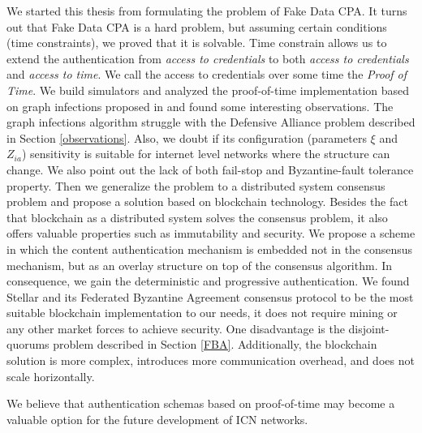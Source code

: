 We started this thesis from formulating the problem of Fake Data CPA. It turns out that Fake Data CPA is a hard problem, but assuming certain conditions (time constraints), we proved that it is solvable. Time constrain allows us to extend the authentication from \textit{access to credentials} to both \textit{access to credentials} and \textit{access to time}. We call the access to credentials over some time the \textit{Proof of Time}. We build simulators and analyzed the proof-of-time implementation based on graph infections proposed in \cite{jekon2019content} and found some interesting observations. The graph infections algorithm struggle with the Defensive Alliance problem described in Section \ref{observations}. Also, we doubt if its configuration (parameters $\xi$ and $Z_{ia}$) sensitivity is suitable for internet level networks where the structure can change. We also point out the lack of both fail-stop and Byzantine-fault tolerance property. Then we generalize the problem to a distributed system consensus problem and propose a solution based on blockchain technology. Besides the fact that blockchain as a distributed system solves the consensus problem, it also offers valuable properties such as immutability and security. We propose a scheme in which the content authentication mechanism is embedded not in the consensus mechanism, but as an overlay structure on top of the consensus algorithm. In consequence, we gain the deterministic and progressive authentication. We found Stellar and its Federated Byzantine Agreement consensus protocol to be the most suitable blockchain implementation to our needs, it does not require mining or any other market forces to achieve security. One disadvantage is the disjoint-quorums problem described in Section \ref{FBA}. Additionally, the blockchain solution is more complex, introduces more communication overhead, and does not scale horizontally.

We believe that authentication schemas based on proof-of-time may become a valuable option for the future development of ICN networks. 

